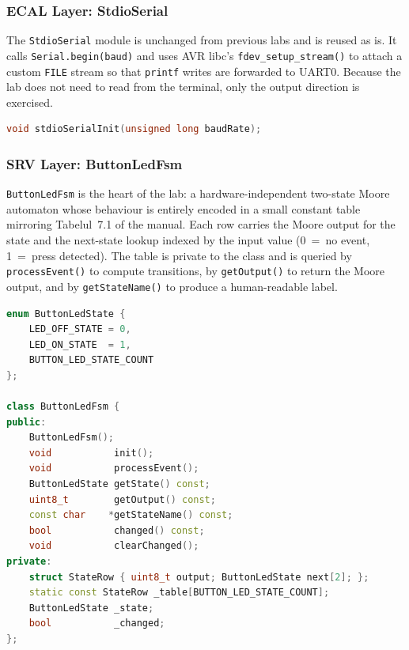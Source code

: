 \subsubsection{ECAL Layer: StdioSerial}

The \texttt{StdioSerial} module is unchanged from previous labs and is reused as is. It calls \texttt{Serial.begin(baud)} and uses AVR libc's \texttt{fdev\_setup\_stream()} to attach a custom \texttt{FILE} stream so that \texttt{printf} writes are forwarded to UART0. Because the lab does not need to read from the terminal, only the output direction is exercised.

\begin{lstlisting}[language=C++, caption=StdioSerial.h --- STDIO redirection interface, label=lst:stdio_h]
void stdioSerialInit(unsigned long baudRate);
\end{lstlisting}

\subsubsection{SRV Layer: ButtonLedFsm}

\texttt{ButtonLedFsm} is the heart of the lab: a hardware-independent two-state Moore automaton whose behaviour is entirely encoded in a small constant table mirroring Tabelul~7.1 of the manual. Each row carries the Moore output for the state and the next-state lookup indexed by the input value (0~=~no event, 1~=~press detected). The table is private to the class and is queried by \texttt{processEvent()} to compute transitions, by \texttt{getOutput()} to return the Moore output, and by \texttt{getStateName()} to produce a human-readable label.

\begin{lstlisting}[language=C++, caption=ButtonLedFsm.h --- FSM interface (excerpt), label=lst:fsm_h]
enum ButtonLedState {
    LED_OFF_STATE = 0,
    LED_ON_STATE  = 1,
    BUTTON_LED_STATE_COUNT
};

class ButtonLedFsm {
public:
    ButtonLedFsm();
    void           init();
    void           processEvent();
    ButtonLedState getState() const;
    uint8_t        getOutput() const;
    const char    *getStateName() const;
    bool           changed() const;
    void           clearChanged();
private:
    struct StateRow { uint8_t output; ButtonLedState next[2]; };
    static const StateRow _table[BUTTON_LED_STATE_COUNT];
    ButtonLedState _state;
    bool           _changed;
};
\end{lstlisting}

